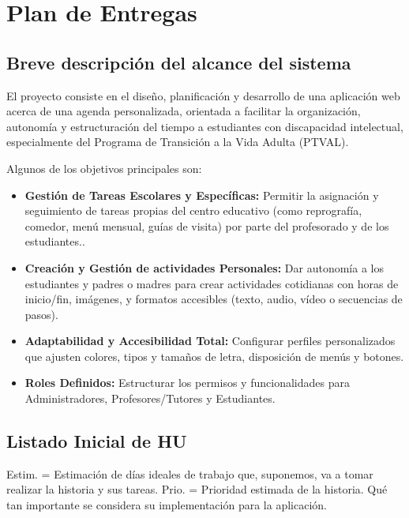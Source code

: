 \section{Plan de Entregas}

\subsection{Breve descripción del alcance del sistema}
El proyecto consiste en el diseño, planificación y desarrollo de una aplicación web acerca de una agenda personalizada, orientada a facilitar la organización, autonomía y estructuración del tiempo a estudiantes con discapacidad intelectual, especialmente del Programa de Transición a la Vida Adulta (PTVAL).

Algunos de los objetivos principales son:

\begin{itemize}
    \item \textbf{Gestión de Tareas Escolares y Específicas:} Permitir la asignación y seguimiento de tareas propias del centro educativo (como reprografía, comedor, menú mensual, guías de visita) por parte del profesorado y de los estudiantes..
    \item \textbf{Creación y Gestión de actividades Personales:} Dar autonomía a los estudiantes y padres o madres para crear actividades cotidianas con horas de inicio/fin, imágenes, y formatos accesibles (texto, audio, vídeo o secuencias de pasos).
    \item \textbf{Adaptabilidad y Accesibilidad Total:} Configurar perfiles personalizados que ajusten colores, tipos y tamaños de letra, disposición de menús y botones.
    \item \textbf{Roles Definidos:} Estructurar los permisos y funcionalidades para Administradores, Profesores/Tutores y Estudiantes.
\end{itemize}

\subsection{Listado Inicial de HU}

Estim. = Estimación de días ideales de trabajo que, suponemos, va a tomar realizar la historia y sus tareas.
Prio.  = Prioridad estimada de la historia. Qué tan importante se considera su implementación para la aplicación.

